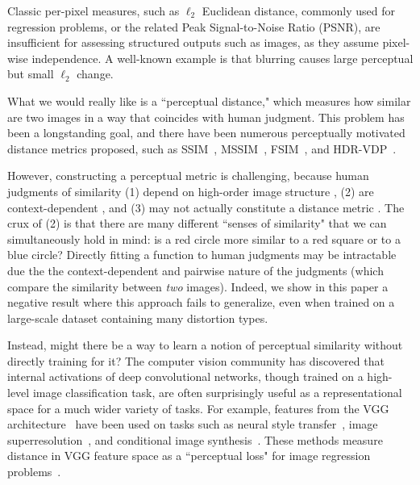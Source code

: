 Classic per-pixel measures, such as $\ell_2$ Euclidean distance, commonly used for regression problems, or the related Peak Signal-to-Noise Ratio (PSNR), are insufficient for assessing structured outputs such as images, as they assume pixel-wise independence. A well-known example is that blurring causes large perceptual but small $\ell_2$ change.

What we would really like is a ``perceptual distance," which measures how similar are two images in a way that coincides with human judgment. This problem has been a longstanding goal,
and there have been numerous perceptually motivated distance metrics proposed, such as SSIM~\cite{wang2004image}, MSSIM~\cite{wang2003multiscale}, FSIM~\cite{zhang2011fsim}, and HDR-VDP~\cite{mantiuk2011hdr}.

However, constructing a perceptual metric is challenging, because human judgments of similarity (1) depend on high-order image structure \cite{wang2004image}, (2) are context-dependent \cite{Goodman1972,medin1993respects,markman2005nonintentional}, and (3) may not actually constitute a distance metric \cite{tversky1977features}.
The crux of (2) is that there are many different ``senses of similarity" that we can simultaneously hold in mind: is a red circle more similar to a red square or to a blue circle? Directly fitting a function to human judgments may be intractable due the the context-dependent and pairwise nature of the judgments (which compare the similarity between \textit{two} images). Indeed, we show in this paper a negative result where this approach fails to generalize, even when trained on a large-scale dataset containing many distortion types.

Instead, might there be a way to learn a notion of perceptual similarity without directly training for it? The computer vision community has discovered that internal activations of deep convolutional networks, though trained on a high-level image classification task, are often surprisingly useful as a representational space for a much wider variety of tasks. For example, features from the VGG architecture~\cite{simonyan2014very} have been used on tasks such as neural style transfer~\cite{gatys2016image}, image superresolution~\cite{johnson2016perceptual}, and conditional image synthesis~\cite{dosovitskiy2016generating,chen2017photographic}. 
These methods measure distance in VGG feature space as a ``perceptual loss" for image regression problems~\cite{johnson2016perceptual,dosovitskiy2016generating}.


